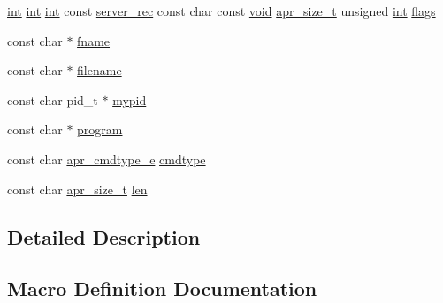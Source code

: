 \begin{DoxyCompactItemize}
\item 
\hyperlink{pcre_8txt_a42dfa4ff673c82d8efe7144098fbc198}{int} \hyperlink{pcre_8txt_a42dfa4ff673c82d8efe7144098fbc198}{int} \hyperlink{pcre_8txt_a42dfa4ff673c82d8efe7144098fbc198}{int} const \hyperlink{structserver__rec}{server\+\_\+rec} const char const \hyperlink{group__MOD__ISAPI_gacd6cdbf73df3d9eed42fa493d9b621a6}{void} \hyperlink{group__apr__platform_gaaa72b2253f6f3032cefea5712a27540e}{apr\+\_\+size\+\_\+t} unsigned \hyperlink{pcre_8txt_a42dfa4ff673c82d8efe7144098fbc198}{int} \hyperlink{group__APACHE__CORE__LOG_ga7e4dc9555382e7e748f65f1bcf814367}{flags}
\item 
const char $\ast$ \hyperlink{group__APACHE__CORE__LOG_ga6a2fc0c236288b07ce5bd1335ca89fa2}{fname}
\item 
const char $\ast$ \hyperlink{group__APACHE__CORE__LOG_ga28849770c8bfeb04039d7dd29d4dfa35}{filename}
\item 
const char pid\+\_\+t $\ast$ \hyperlink{group__APACHE__CORE__LOG_gab5f16f2092ef43bfe07a17d13f489b67}{mypid}
\item 
const char $\ast$ \hyperlink{group__APACHE__CORE__LOG_gac21a604824a10f311a4fad1d701f5115}{program}
\item 
const char \hyperlink{group__apr__thread__proc_gadcb981d7748c580eb69ac11dbf709060}{apr\+\_\+cmdtype\+\_\+e} \hyperlink{group__APACHE__CORE__LOG_gab4c4e8081a1019039c687d48fa0a54ee}{cmdtype}
\item 
const char \hyperlink{group__apr__platform_gaaa72b2253f6f3032cefea5712a27540e}{apr\+\_\+size\+\_\+t} \hyperlink{group__APACHE__CORE__LOG_gab5a43233d60ef05c5b5bf5cba3d74468}{len}
\end{DoxyCompactItemize}


\subsection{Detailed Description}


\subsection{Macro Definition Documentation}
